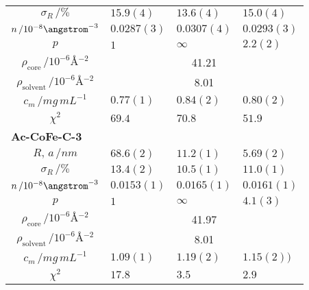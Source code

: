 \documentclass[\main/dresen_thesis.tex]{subfiles}
\begin{document}
\begin{table}[!htbp]
\begin{tabular}{ c | l | l | l }
        \rule{0pt}{2ex} $\sigma_R \, / \unit{\%}$                     & $15.9(4)$      & $13.6(4)$  & $15.0(4)$\\
        \rule{0pt}{2ex} $n \, / 10^{-8} \angstrom^{-3}$               & $0.0287(3)$    & $0.0307(4)$& $0.0293(3)$\\
        \rule{0pt}{2ex} $p$                                           & $1$            & $\infty$   & $2.2(2)$\\
        \hline
        \rule{0pt}{2ex} $\rho_\mathrm{core}    \, / \unit{10^{-6} \angstrom^{-2}}$     & \multicolumn{3}{c}{41.21}\\
        \rule{0pt}{2ex} $\rho_\mathrm{solvent} \, / \unit{10^{-6} \angstrom^{-2}}$     & \multicolumn{3}{c}{8.01}\\
        \hline
        \rule{0pt}{2ex} $c_m \, / \unit{mg\, mL^{-1}}$                & $0.77(1)$      & $0.84(2)$  & $0.80(2)$\\
        \hline
        \rule{0pt}{2ex} $\chi^2$                                      & $69.4$         & $70.8$     & $51.9$\\
        \hline
        \hline
        \multicolumn{4}{l}{\textbf{Ac-CoFe-C-3}}\\
        \hline
        \rule{0pt}{2ex} $R, \, a \, / \unit{nm}$                      & $68.6(2)$      & $11.2(1)$  & $5.69(2)$\\
        \rule{0pt}{2ex} $\sigma_R \, / \unit{\%}$                     & $13.4(2)$      & $10.5(1)$  & $11.0(1)$\\
        \rule{0pt}{2ex} $n \, / 10^{-8} \angstrom^{-3}$               & $0.0153(1)$    & $0.0165(1)$& $0.0161(1)$\\
        \rule{0pt}{2ex} $p$                                           & $1$            & $\infty$   & $4.1(3)$\\
        \hline
        \rule{0pt}{2ex} $\rho_\mathrm{core}    \, / \unit{10^{-6} \angstrom^{-2}}$     & \multicolumn{3}{c}{41.97}\\
        \rule{0pt}{2ex} $\rho_\mathrm{solvent} \, / \unit{10^{-6} \angstrom^{-2}}$     & \multicolumn{3}{c}{8.01}\\
        \hline
        \rule{0pt}{2ex} $c_m \, / \unit{mg\, mL^{-1}}$                & $1.09(1)$      & $1.19(2)$  & $1.15(2))$\\
        \hline
        \rule{0pt}{2ex} $\chi^2$                                      & $17.8$         & $3.5$     & $2.9$\\
        \hline
      \end{tabular}
    \end{table}
\end{document}

